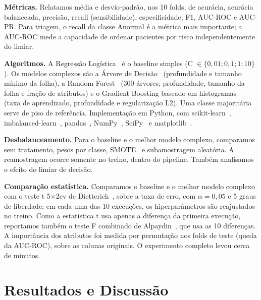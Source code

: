 \documentclass[conference]{IEEEtran}
\begin{document}
\textbf{Métricas.} Relatamos média e desvio-padrão, nos 10 folds, de acurácia, acurácia balanceada, precisão, recall (sensibilidade), especificidade, F1, AUC-ROC e AUC-PR. Para triagem, o recall da classe Anormal é a métrica mais importante; a AUC-ROC mede a capacidade de ordenar pacientes por risco independentemente do limiar.

\textbf{Algoritmos.} A Regressão Logística~\cite{hosmer2013} é o baseline simples (C $\in \{0{,}01; 0{,}1; 1; 10\}$). Os modelos complexos são a Árvore de Decisão~\cite{breiman1984} (profundidade e tamanho mínimo da folha), a Random Forest~\cite{breiman2001} (300 árvores; profundidade, tamanho da folha e fração de atributos) e o Gradient Boosting baseado em histogramas~\cite{friedman2001,ke2017} (taxa de aprendizado, profundidade e regularização L2). Uma classe majoritária serve de piso de referência. Implementação em Python, com scikit-learn~\cite{pedregosa2011}, imbalanced-learn~\cite{lemaitre2017}, pandas~\cite{mckinney2010}, NumPy~\cite{harris2020}, SciPy~\cite{virtanen2020} e matplotlib~\cite{hunter2007}.

\textbf{Desbalanceamento.} Para o baseline e o melhor modelo complexo, comparamos sem tratamento, pesos por classe, SMOTE~\cite{chawla2002} e subamostragem aleatória. A reamostragem ocorre somente no treino, dentro do pipeline. Também analisamos o efeito do limiar de decisão.

\textbf{Comparação estatística.} Comparamos o baseline e o melhor modelo complexo com o teste t 5$\times$2cv de Dietterich~\cite{dietterich1998}, sobre a taxa de erro, com $\alpha = 0{,}05$ e 5 graus de liberdade; em cada uma das 10 execuções, os hiperparâmetros são reajustados no treino. Como a estatística t usa apenas a diferença da primeira execução, reportamos também o teste F combinado de Alpaydin~\cite{alpaydin1999}, que usa as 10 diferenças. A importância dos atributos foi medida por permutação nos folds de teste (queda da AUC-ROC), sobre as colunas originais. O experimento completo levou cerca de \tempoMin{} minutos.

\section{Resultados e Discussão}

\begin{table}[!t]
\caption{Desempenho na validação cruzada aninhada (média e desvio-padrão em 10 folds; cenário sem Sopro; limiar 0,5). Em negrito, o melhor valor entre os modelos treinados}
\label{tab:modelos}
\centering\footnotesize

\end{table}
\end{document}
